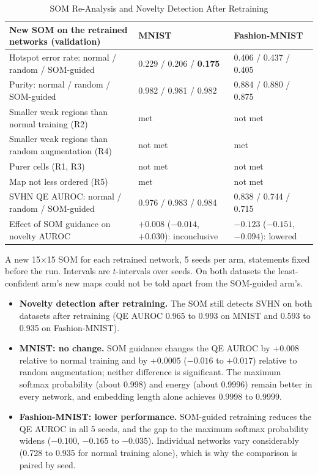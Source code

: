 \documentclass{scrartcl}
\begin{document}
\begin{table}[H]
\centering
\caption{SOM Re-Analysis and Novelty Detection After Retraining}
\label{tab:reanalysis}
\renewcommand{\arraystretch}{1.12}
\footnotesize
\begin{tabular}{|L{0.42\textwidth}|C{0.23\textwidth}|C{0.23\textwidth}|}
\hline
\textbf{New SOM on the retrained networks (validation)} & \textbf{MNIST} & \textbf{Fashion-MNIST} \\ \hline
Hotspot error rate: normal / random / SOM-guided & 0.229 / 0.206 / \textbf{0.175} & 0.406 / 0.437 / 0.405 \\ \hline
Purity: normal / random / SOM-guided & 0.982 / 0.981 / 0.982 & 0.884 / 0.880 / 0.875 \\ \hline
Smaller weak regions than normal training (R2) & met & not met \\ \hline
Smaller weak regions than random augmentation (R4) & not met & met \\ \hline
Purer cells (R1, R3) & not met & not met \\ \hline
Map not less ordered (R5) & met & not met \\ \hline
SVHN QE AUROC: normal / random / SOM-guided & 0.976 / 0.983 / 0.984 & 0.838 / 0.744 / 0.715 \\ \hline
Effect of SOM guidance on novelty AUROC & $+0.008$ ($-0.014$, $+0.030$): inconclusive & $-0.123$ ($-0.151$, $-0.094$): lowered \\ \hline
\end{tabular}

\par\vspace{3pt}
{\footnotesize\raggedright\noindent A new 15$\times$15 SOM for each retrained network, 5 seeds per arm, statements fixed before the run. Intervals are $t$-intervals over seeds. On both datasets the least-confident arm's new maps could not be told apart from the SOM-guided arm's.\par}
\end{table}

\begin{itemize}
  \item \textbf{Novelty detection after retraining.} The SOM still detects SVHN on both datasets after retraining (QE AUROC 0.965 to 0.993 on MNIST and 0.593 to 0.935 on Fashion-MNIST).
  \item \textbf{MNIST: no change.} SOM guidance changes the QE AUROC by $+0.008$ relative to normal training and by $+0.0005$ ($-0.016$ to $+0.017$) relative to random augmentation; neither difference is significant. The maximum softmax probability (about 0.998) and energy (about 0.9996) remain better in every network, and embedding length alone achieves 0.9998 to 0.9999.
  \item \textbf{Fashion-MNIST: lower performance.} SOM-guided retraining reduces the QE AUROC in all 5 seeds, and the gap to the maximum softmax probability widens ($-0.100$, $-0.165$ to $-0.035$). Individual networks vary considerably (0.728 to 0.935 for normal training alone), which is why the comparison is paired by seed.
\end{itemize}
\end{document}
